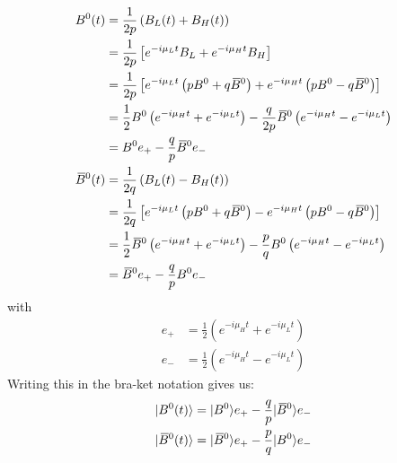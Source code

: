 \begin{align}
    B^0(t) &= \frac{1}{2p}\left(B_L(t)+B_H(t)\right)\nonumber\\
    &= \frac{1}{2p}\left[e^{-i\mu_Lt}B_L + e^{-i\mu_Ht}B_H\right]\nonumber\\
    &=\frac{1}{2p}\left[e^{-i\mu_Lt}\left(pB^0 + q \kern 0.18em\overline{\kern -0.18em B}{}^0\right) + e^{-i\mu_Ht}\left(pB^0 - q \kern 0.18em\overline{\kern -0.18em B}{}^0\right)\right] \nonumber\\
    &=\frac{1}{2}B^0\left(e^{-i\mu_Ht} + e^{-i\mu_Lt} \right) - \frac{q}{2p} \kern 0.18em\overline{\kern -0.18em B}{}^0 \left(e^{-i\mu_Ht} - e^{-i\mu_Lt} \right)\nonumber\\
    &= B^0 e_+ - \frac{q}{p} \kern 0.18em\overline{\kern -0.18em B}{}^0 e_-\\
    \kern 0.18em\overline{\kern -0.18em B}{}^0(t) &= \frac{1}{2q}\left(B_L(t)-B_H(t)\right)\nonumber\\
    &= \frac{1}{2q} \left[e^{-i\mu_Lt}\left(pB^0 + q \kern 0.18em\overline{\kern -0.18em B}{}^0\right) - e^{-i\mu_Ht}\left(pB^0 - q \kern 0.18em\overline{\kern -0.18em B}{}^0\right)\right]\nonumber\\
    &= \frac{1}{2} \kern 0.18em\overline{\kern -0.18em B}{}^0 \left(e^{-i\mu_Ht} + e^{-i\mu_Lt} \right) -\frac{p}{q} B^0 \left(e^{-i\mu_Ht} - e^{-i\mu_Lt} \right)\nonumber\\
    &= \kern 0.18em\overline{\kern -0.18em B}{}^0 e_+ - \frac{q}{p}B^0 e_-
\end{align}
with
\begin{align}
    e_+ &= \frac{1}{2}\left(e^{-i\mu_Ht} + e^{-i\mu_Lt} \right)\\
    e_- &= \frac{1}{2}\left(e^{-i\mu_Ht} - e^{-i\mu_Lt} \right)
\end{align}
Writing this in the bra-ket notation gives us:
\begin{align}
    |B^0(t)\rangle = |B^0\rangle e_+ -\frac{q}{p} |\kern 0.18em\overline{\kern -0.18em B}{}^0\rangle e_-\\
    |\kern 0.18em\overline{\kern -0.18em B}{}^0(t)\rangle = |\kern 0.18em\overline{\kern -0.18em B}{}^0\rangle e_+ -\frac{p}{q} |B^0\rangle e_-
\end{align}

